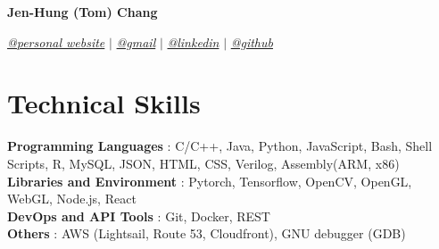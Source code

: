 \documentclass[letterpaper,11pt]{article}
\newcommand{\namespace}{
\vspace{3pt}
}
\newcommand{\sectionspace}{
\vspace{-20pt}
}
\newcommand{\subheadingtitlevspace}{
\vspace{-3pt}
}
\newcommand{\titleItem}[1]{
  \textbf{#1}
}
\begin{document}
\begin{center}
    \textbf{\huge{\center Jen-Hung (Tom) Chang }} \\
    \namespace
    \href{https://d3h8gbhbp2l0t0.cloudfront.net}{{\textit{@personal website}}} $|$
    \href{mailto:tom.jenhungchang@gmail.com}{{\textit{@gmail}}} $|$ 
    \href{https://linkedin.com/in/JenhungChang}{{\textit{@linkedin}}} $|$
    \href{https://github.com/tom89622}{{\textit{@github}}}
    \vspace{-8pt}
\end{center}

    

\section{Technical Skills}
\subheadingtitlevspace
  \begin{itemize}[leftmargin=0.15in, label={}]
    {\item{
      \titleItem{Programming Languages}{: C/C++, Java, Python, JavaScript, Bash, Shell Scripts, R, MySQL, JSON, HTML, CSS, Verilog, Assembly(ARM, x86)} \\
      \titleItem{Libraries and Environment}{: Pytorch, Tensorflow, OpenCV, OpenGL, WebGL, Node.js, React} \\
      \titleItem{DevOps and API Tools}{: Git, Docker, REST} \\
      \titleItem{Others}{: AWS (Lightsail, Route 53, Cloudfront), GNU debugger (GDB)}
    }}
  \end{itemize}
\sectionspace
\end{document}
